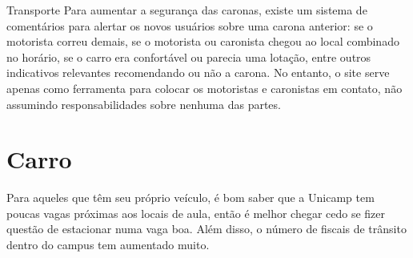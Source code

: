 \begin{story}{Transporte}
Para aumentar a segurança das caronas, existe um sistema de comentários para alertar os novos usuários sobre uma carona anterior: se o motorista correu demais, se o motorista ou caronista chegou ao local combinado no horário, se o carro era confortável ou parecia uma lotação, entre outros indicativos relevantes recomendando ou não a carona. No entanto, o site serve apenas como ferramenta para colocar os motoristas e caronistas em contato, não assumindo responsabilidades sobre nenhuma das partes.

\section*{Carro}

Para aqueles que têm seu próprio veículo, é bom saber que a Unicamp tem poucas vagas próximas aos locais de aula, então é melhor chegar cedo se fizer questão de estacionar numa vaga boa. Além disso, o número de fiscais de trânsito dentro do campus tem aumentado muito.

\end{story}

